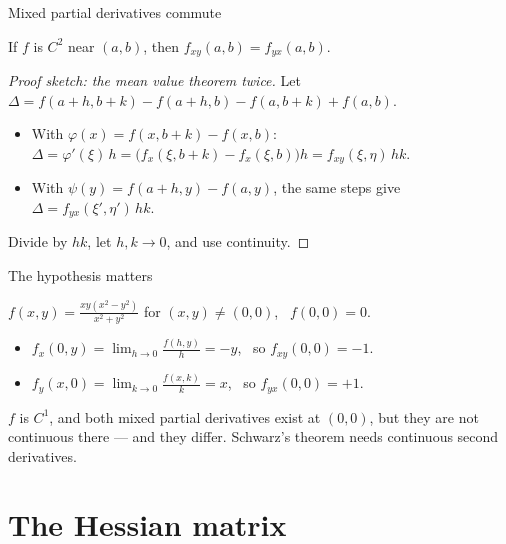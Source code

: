 \documentclass[10pt]{wosm-slides}
\begin{document}
\begin{frame}{Mixed partial derivatives commute}
  \begin{theorem}
    If $f$ is $C^2$ near $(a, b)$, then $f_{xy}(a, b) = f_{yx}(a, b)$.
  \end{theorem}
  \pause
  \begin{proof}[Proof sketch: the mean value theorem twice]
    Let $\Delta = f(a+h, b+k) - f(a+h, b) - f(a, b+k) + f(a, b)$.
    \begin{itemize}
      \item With $\varphi(x) = f(x, b+k) - f(x, b)$: \ $\Delta = \varphi'(\xi)\,h
        = \bigl(f_x(\xi, b+k) - f_x(\xi, b)\bigr) h = f_{xy}(\xi, \eta)\, hk$.
      \item With $\psi(y) = f(a+h, y) - f(a, y)$, the same steps give
        $\Delta = f_{yx}(\xi', \eta')\, hk$.
    \end{itemize}
    Divide by $hk$, let $h, k \to 0$, and use continuity.
  \end{proof}
\end{frame}

\begin{frame}{The hypothesis matters}
  \begin{example}
    $f(x, y) = \frac{xy(x^2 - y^2)}{x^2 + y^2}$ for $(x, y) \ne (0, 0)$, \ $f(0, 0) = 0$.
    \begin{itemize}
      \item $f_x(0, y) = \lim_{h \to 0} \frac{f(h, y)}{h} = -y$, \ so $f_{xy}(0, 0) = -1$.
      \item $f_y(x, 0) = \lim_{k \to 0} \frac{f(x, k)}{k} = x$, \ so $f_{yx}(0, 0) = +1$.
    \end{itemize}
  \end{example}
  \pause
  \begin{warning}
    $f$ is $C^1$, and both mixed partial derivatives exist at $(0, 0)$, but they are not continuous
    there --- and they differ. Schwarz's theorem needs continuous second derivatives.
  \end{warning}
\end{frame}

\section{The Hessian matrix}
\end{document}
